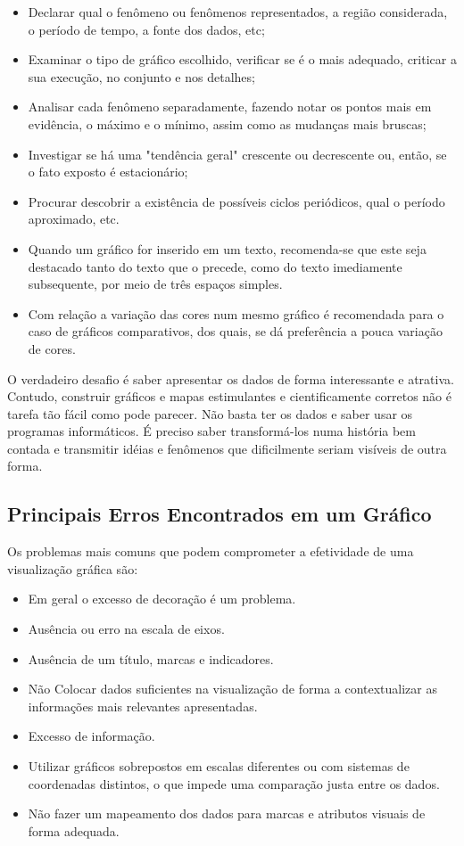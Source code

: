 \begin{itemize}
\item Declarar qual o fenômeno ou fenômenos representados, a
região considerada, o período de tempo, a fonte dos dados, etc;
\item Examinar o tipo de gráfico escolhido, verificar se é o mais
adequado, criticar a sua execução, no conjunto e nos detalhes;
\item Analisar cada fenômeno separadamente, fazendo notar os
pontos mais em evidência, o máximo e o mínimo, assim como as
mudanças mais bruscas; \item Investigar se há uma "tendência
geral" crescente ou decrescente ou, então, se o fato exposto é
estacionário; \item Procurar descobrir a existência de possíveis
ciclos periódicos, qual o período aproximado, etc. \item Quando um
gráfico for inserido em um texto, recomenda-se que este seja
destacado tanto do texto que o precede, como do texto imediamente
subsequente, por meio de três espaços simples. \item Com relação a
variação das cores num mesmo gráfico é recomendada para o caso de
gráficos comparativos, dos quais, se dá preferência a pouca
variação de cores.
\end{itemize}

O verdadeiro desafio é saber apresentar os dados de forma interessante e atrativa. Contudo, construir gráficos e mapas estimulantes e cientificamente corretos não é tarefa tão fácil como pode parecer. Não basta ter os dados e saber usar os programas informáticos. É preciso saber transformá-los numa história bem contada e transmitir idéias e fenômenos que dificilmente seriam visíveis de outra forma.

\newpage
\subsection{Principais Erros Encontrados em um Gráfico}
\inic Os problemas mais comuns que podem comprometer a efetividade de uma visualização gráfica são:


\begin{itemize}
\item Em geral o excesso de decoração é um problema.
\item Ausência ou erro na escala de eixos.
\item Ausência de um título, marcas e indicadores.
\item Não Colocar dados suficientes na visualização de forma a contextualizar as informações mais relevantes apresentadas.
\item Excesso de informação.
\item  Utilizar gráficos sobrepostos em escalas diferentes ou com sistemas de coordenadas distintos, o que impede uma comparação justa entre os dados.
\item Não fazer um mapeamento dos dados para marcas e atributos visuais de forma adequada.
\end{itemize}



